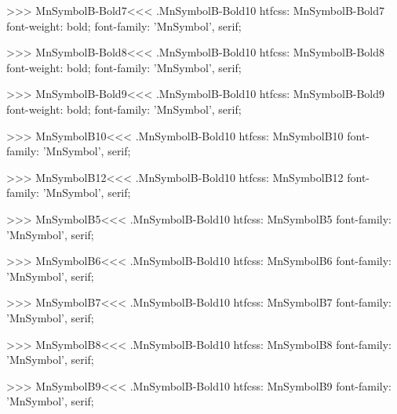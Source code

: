 >>>
\<MnSymbolB-Bold7\><<<
.MnSymbolB-Bold10
htfcss:  MnSymbolB-Bold7  font-weight: bold; font-family: 'MnSymbol', serif;

>>>
\<MnSymbolB-Bold8\><<<
.MnSymbolB-Bold10
htfcss:  MnSymbolB-Bold8  font-weight: bold; font-family: 'MnSymbol', serif;

>>>
\<MnSymbolB-Bold9\><<<
.MnSymbolB-Bold10
htfcss:  MnSymbolB-Bold9  font-weight: bold; font-family: 'MnSymbol', serif;

>>>
\<MnSymbolB10\><<<
.MnSymbolB-Bold10
htfcss:  MnSymbolB10  font-family: 'MnSymbol', serif;

>>>
\<MnSymbolB12\><<<
.MnSymbolB-Bold10
htfcss:  MnSymbolB12  font-family: 'MnSymbol', serif;

>>>
\<MnSymbolB5\><<<
.MnSymbolB-Bold10
htfcss:  MnSymbolB5  font-family: 'MnSymbol', serif;

>>>
\<MnSymbolB6\><<<
.MnSymbolB-Bold10
htfcss:  MnSymbolB6  font-family: 'MnSymbol', serif;

>>>
\<MnSymbolB7\><<<
.MnSymbolB-Bold10
htfcss:  MnSymbolB7  font-family: 'MnSymbol', serif;

>>>
\<MnSymbolB8\><<<
.MnSymbolB-Bold10
htfcss:  MnSymbolB8  font-family: 'MnSymbol', serif;

>>>
\<MnSymbolB9\><<<
.MnSymbolB-Bold10
htfcss:  MnSymbolB9  font-family: 'MnSymbol', serif;

